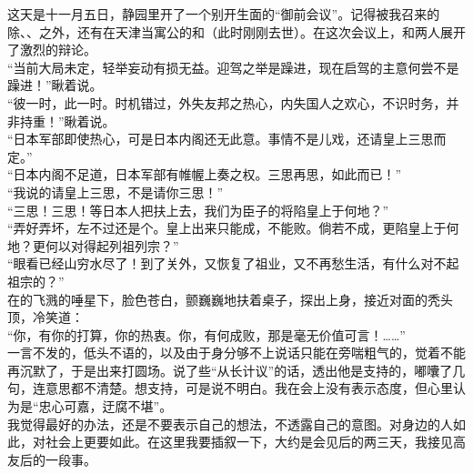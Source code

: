 这天是十一月五日，静园里开了一个别开生面的“御前会议”。记得被我召来的除、、之外，还有在天津当寓公的和（此时刚刚去世）。在这次会议上，和两人展开了激烈的辩论。\\

“当前大局未定，轻举妄动有损无益。迎驾之举是躁进，现在启驾的主意何尝不是躁进！”瞅着说。\\

“彼一时，此一时。时机错过，外失友邦之热心，内失国人之欢心，不识时务，并非持重！”瞅着说。\\

“日本军部即使热心，可是日本内阁还无此意。事情不是儿戏，还请皇上三思而定。”\\

“日本内阁不足道，日本军部有帷幄上奏之权。三思再思，如此而已！”\\

“我说的请皇上三思，不是请你三思！”\\

“三思！三思！等日本人把扶上去，我们为臣子的将陷皇上于何地？”\\

“弄好弄坏，左不过还是个。皇上出来只能成，不能败。倘若不成，更陷皇上于何地？更何以对得起列祖列宗？”\\

“眼看已经山穷水尽了！到了关外，又恢复了祖业，又不再愁生活，有什么对不起祖宗的？”\\

在的飞溅的唾星下，脸色苍白，颤巍巍地扶着桌子，探出上身，接近对面的秃头顶，冷笑道：\\

“你，有你的打算，你的热衷。你，有何成败，那是毫无价值可言！……”\\

一言不发的，低头不语的，以及由于身分够不上说话只能在旁喘粗气的，觉着不能再沉默了，于是出来打圆场。说了些“从长计议”的话，透出他是支持的，嘟囔了几句，连意思都不清楚。想支持，可是说不明白。我在会上没有表示态度，但心里认为是“忠心可嘉，迂腐不堪”。\\

我觉得最好的办法，还是不要表示自己的想法，不透露自己的意图。对身边的人如此，对社会上更要如此。在这里我要插叙一下，大约是会见后的两三天，我接见高友后的一段事。\\

